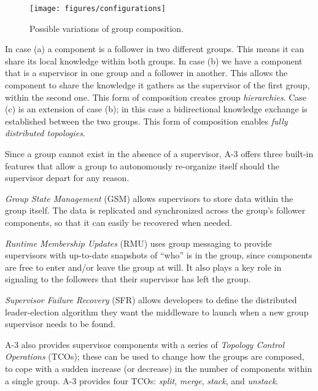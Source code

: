 \begin{figure}[ht]
\centering
\texttt{[image: figures/configurations]}
\caption{Possible variations of group composition.}
\label{fig:configurations}
\end{figure}

\noindent In case (a) a component is a follower in two different groups. This means it can share its local knowledge within both groups. In case (b) we have a component that is a supervisor in one group and a follower in another. This allows the component to share the knowledge it gathers as the supervisor of the first group, within the second one. This form of composition creates group \emph{hierarchies}. Case (c) is an extension of case (b); in this case a bidirectional knowledge exchange is established between the two groups. This form of composition enables \emph{fully distributed topologies}.


Since a group cannot exist in the absence of a supervisor, A-3 offers three built-in features that allow a group to autonomously re-organize itself should the supervisor depart for any reason.

\emph{Group State Management} (GSM) allows supervisors to store data within the group itself. The data is replicated and synchronized across the group's follower components, so that it can easily be recovered when needed. 

\emph{Runtime Membership Updates} (RMU) uses group messaging to provide supervisors with up-to-date snapshots of ``who'' is in the group, since components are free to enter and/or leave the group at will. It also plays a key role in signaling to the followers that their supervisor has left the group. 

\emph{Supervisor Failure Recovery} (SFR) allows developers to define the distributed leader-election algorithm they want the middleware to launch when a new group supervisor needs to be found. 


A-3 also provides supervisor components with a series of \emph{Topology Control Operations} (TCOs); these can be used to change how the groups are composed, to cope with a sudden increase (or decrease) in the number of components within a single group. A-3 provides four TCOs: \emph{split}, \emph{merge}, \emph{stack}, and \emph{unstack}. 

